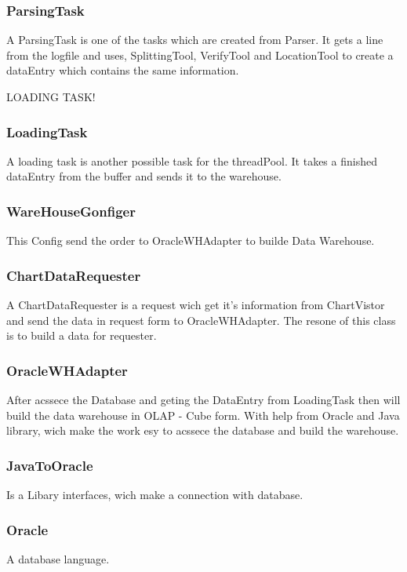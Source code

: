 \subsubsection*{ParsingTask}
A ParsingTask is one of the tasks which are created from Parser. It gets a line from the logfile and uses, SplittingTool, VerifyTool
and LocationTool to create a dataEntry which contains the same information. 

LOADING TASK!

\subsubsection*{LoadingTask}
A loading task is another possible task for the threadPool. It takes a finished dataEntry from the buffer and sends it to the warehouse.

\subsubsection*{WareHouseGonfiger}

This Config send the order to OracleWHAdapter to builde Data Warehouse.

\subsubsection*{ChartDataRequester}

A ChartDataRequester is a request wich get it's information from ChartVistor and send the data in request form to OracleWHAdapter.
The resone of this class is to build a data for requester.

\subsubsection*{OracleWHAdapter}

After acssece the Database and geting the DataEntry from LoadingTask then will build the data warehouse in OLAP - Cube form. With help from Oracle 
and Java library, wich make the work esy to acssece the database and build the warehouse.

\subsubsection*{JavaToOracle}

Is a Libary interfaces, wich make a connection with database.

\subsubsection*{Oracle}

A database language.

